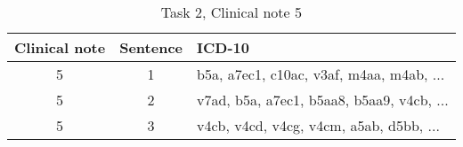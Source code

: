 \begin{table}[htbp] \footnotesize \center
\caption{Task 2, Clinical note 5 \label{tab:t2c5}}
\begin{tabularx}{\textwidth}{c c X}
    \toprule
    Clinical note & Sentence & ICD-10 \\
    \midrule
	 5 & 1 & b5a, a7ec1, c10ac, v3af, m4aa, m4ab, ... \\
	 5 & 2 & v7ad, b5a, a7ec1, b5aa8, b5aa9, v4cb, ... \\
	 5 & 3 & v4cb, v4cd, v4cg, v4cm, a5ab, d5bb, ... \\
	\bottomrule
\end{tabularx}
\end{table}